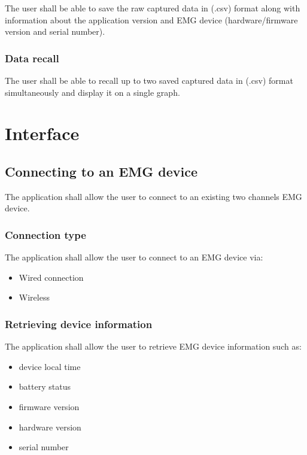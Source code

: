 \documentclass[12pt,a4paper]{article}
\begin{document}
The user shall be able to save the raw captured data in (.csv) format along with information about the application version and EMG device (hardware/firmware version and serial number).

\subsubsection{Data recall}

The user shall be able to recall up to two saved captured data in (.csv) format simultaneously and display it on a single graph.

\newpage

\section{Interface}

\subsection{Connecting to an EMG device}

The application shall allow the user to connect to an existing two channels EMG device.

\subsubsection{Connection type}

The application shall allow the user to connect to an EMG device via:

\begin{itemize}
\item Wired connection
\item Wireless
\end{itemize}

\subsubsection{Retrieving device information}

The application shall allow the user to retrieve EMG device information such as: 

\begin{itemize}
\item device local time
\item battery status
\item firmware version
\item hardware version
\item serial number
\end{itemize}
\end{document}
